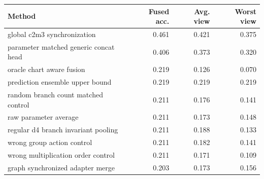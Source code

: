 \begin{tabular}{lrrr}
\toprule
Method & Fused acc. & Avg. view & Worst view\\
\midrule
global c2m3 synchronization & 0.461 & 0.421 & 0.375\\
parameter matched generic concat head & 0.406 & 0.373 & 0.320\\
oracle chart aware fusion & 0.219 & 0.126 & 0.070\\
prediction ensemble upper bound & 0.219 & 0.219 & 0.219\\
random branch count matched control & 0.211 & 0.176 & 0.141\\
raw parameter average & 0.211 & 0.173 & 0.148\\
regular d4 branch invariant pooling & 0.211 & 0.188 & 0.133\\
wrong group action control & 0.211 & 0.182 & 0.141\\
wrong multiplication order control & 0.211 & 0.171 & 0.109\\
graph synchronized adapter merge & 0.203 & 0.173 & 0.156\\
\bottomrule
\end{tabular}

